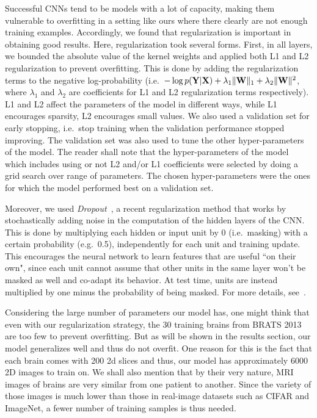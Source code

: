 \documentclass[final,5p,times,twocolumn]{elsarticle}
\begin{document}
Successful CNNs tend to be models with a lot of capacity, making them vulnerable to overfitting in a setting like ours where there clearly are not enough training examples.   Accordingly, we found that regularization is important in obtaining good results. Here, regularization took several forms. First, in all layers, we bounded the absolute value of the kernel weights and applied both L1 and L2 regularization to prevent overfitting. This is done by adding the regularization terms to the negative log-probability (i.e.\ $-\log p({\bf Y}|{\bf X}) + \lambda_1 \|{\bf W}\|_1 + \lambda_2\|{\bf W}\|^2$, where $\lambda_1$ and $\lambda_2$ are coefficients for L1 and L2 regularization terms respectively). L1 and L2 affect the parameters of the model in different ways, while L1 encourages sparsity, L2 encourages small values. 
We also used a validation set for early stopping, i.e.\ stop training when the validation performance stopped improving. The validation set was also used to tune the other hyper-parameters of the model. The reader shall note that the hyper-parameters of the model which includes using or not L2 and/or L1 coefficients were selected by doing a grid search over range of parameters.  The chosen hyper-parameters were the ones for which the model performed best on a validation set.

Moreover, we used {\it Dropout}~\citep{Srivastava14a}, a recent regularization method that works by stochastically adding noise in the computation of the hidden layers of the CNN. This is done by multiplying each hidden or input unit by 0 (i.e.\ masking) with a certain probability (e.g.\ 0.5), independently for each unit and training update. This encourages the neural network to learn features that are useful ``on their own", since each unit cannot assume that other units in the same layer won't be masked as well and co-adapt its behavior. At test time, units are instead multiplied by one minus the probability of being masked. For more details, see~\citet{Srivastava14a}.

 Considering the large number of parameters our model has, one might think that even with our regularization strategy, the 30 training brains from BRATS 2013 are too few to prevent overfitting.  But as will be shown in the results section, our model generalizes well and thus do not overfit.  One reason for this is the fact that each brain comes with 200 2d slices and thus, our model has approximately 6000 2D images to train on.   We shall also mention that by their very nature, MRI images of brains are very similar from one patient to another. Since the variety of those images is much lower than those in real-image datasets such as CIFAR and ImageNet, a fewer number of training samples is thus needed.
\end{document}
